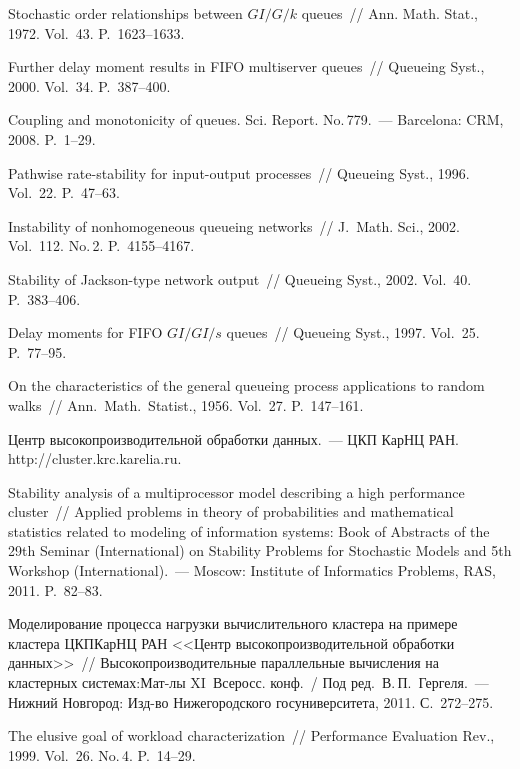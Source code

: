 \begin{multicols}{2}
{{\begin{thebibliography}{99}
 Stochastic order relationships between $GI/G/k$ queues~// 
Ann. Math. Stat., 1972. Vol.~43.  P.~1623--1633.

 Further delay moment results in FIFO multiserver queues~// 
Queueing Syst., 2000. Vol.~34. P.~387--400.

  Coupling and monotonicity of queues. Sci. Report. No.\,779.~--- 
Barcelona: CRM, 2008. P.~1--29.

  Pathwise rate-stability for input-output processes~// 
Queueing Syst., 1996. Vol.~22. P.~47--63.

 Instability of nonhomogeneous queueing networks~// J.~Math. Sci., 2002. Vol.~112. No.\,2. P.~4155--4167.

 Stability of Jackson-type network output~// 
Queueing Syst., 2002. Vol.~40. P.~383--406.

 Delay moments for FIFO $GI/GI/s$ queues~// 
Queueing Syst., 1997. Vol.~25. P.~77--95.

 On the characteristics of the general queueing process 
applications to random walks~// Ann.~Math.~Statist., 1956. Vol.~27. P.~147--161.

Центр высокопроизводительной обработки данных.~--- ЦКП КарНЦ РАН.
{\sf http://cluster.krc.karelia.ru}.

 Stability analysis of a multiprocessor model 
describing a high performance cluster~// 
Applied problems in theory of probabilities and mathematical statistics 
related to modeling of information systems: Book of Abstracts of the 29th 
 Seminar (International) on Stability Problems for Stochastic Models and 
 5th Workshop (International).~--- Moscow: Institute of Informatics Problems, RAS, 2011. P.~82--83.

 Моделирование процесса нагрузки вычислительного кластера 
на примере кластера ЦКП\linebreak КарНЦ РАН <<Центр высокопроизводительной обработки данных>>~// 
Высокопроизводительные параллельные вычисления на кластерных системах:\linebreak Мат-лы 
XI~Всеросс. конф.~/ Под ред.~В.\,П.~Гергеля.~--- Нижний Новгород: Изд-во 
Нижегородского госуниверситета, 2011. С.~272--275.

\label{end\stat}

 The elusive goal of workload characterization~// 
Performance Evaluation Rev., 1999. Vol.~26. No.\,4. P.~14--29.
 \end{thebibliography}
}
}


\end{multicols}
